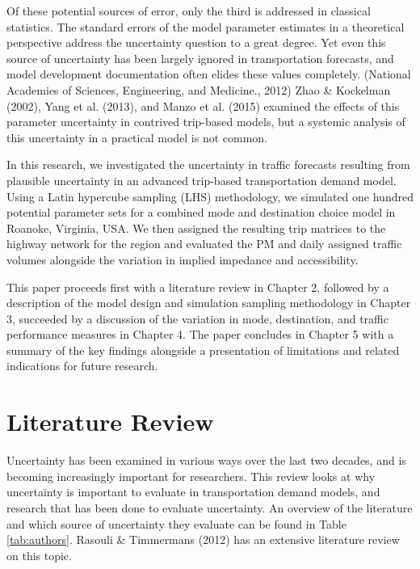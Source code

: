 \documentclass[fancy, masters, twoside]{byuthesis}
\begin{document}
Of these potential sources of error, only the third is addressed in classical statistics. The standard errors of the model parameter estimates in a theoretical perspective address the uncertainty question to a great degree. Yet even this source of uncertainty has been largely ignored in transportation forecasts, and model development documentation often elides these values completely. (National Academies of Sciences, Engineering, and Medicine., 2012) Zhao \& Kockelman (2002), Yang et al. (2013), and Manzo et al. (2015) examined the effects of this parameter uncertainty in contrived trip-based models, but a systemic analysis of this uncertainty in a practical model is not common.

In this research, we investigated the uncertainty in traffic forecasts resulting from plausible uncertainty in an advanced trip-based transportation demand model. Using a Latin hypercube sampling (LHS) methodology, we simulated one hundred potential parameter sets for a combined mode and destination choice model in Roanoke, Virginia, USA. We then assigned the resulting trip matrices to the highway network for the region and evaluated the PM and daily assigned traffic volumes alongside the variation in implied impedance and accessibility.

This paper proceeds first with a literature review in Chapter 2, followed by a description of the model design and simulation sampling methodology in Chapter 3, succeeded by a discussion of the variation in mode, destination, and traffic performance measures in Chapter 4. The paper concludes in Chapter 5 with a summary of the key findings alongside a presentation of limitations and related indications for future research.

\hypertarget{literature-review}{%
\chapter{Literature Review}\label{literature-review}}

Uncertainty has been examined in various ways over the last two decades, and is becoming increasingly important for researchers. This review looks at why uncertainty is important to evaluate in transportation demand models, and research that has been done to evaluate uncertainty. An overview of the literature and which source of uncertainty they evaluate can be found in Table \ref{tab:authors}. Rasouli \& Timmermans (2012) has an extensive literature review on this topic.
\end{document}
